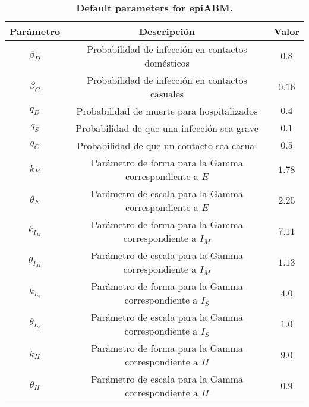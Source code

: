 \begin{table}[!ht]
    \centering
    \caption{\textbf{Default parameters for epiABM.}}
    \label{table:default_params}
    \begin{tabular}{|c|c|c|}
      \hline
      Parámetro & Descripción & Valor \\ \hline
      $\beta_D$      & Probabilidad de infección en contactos domésticos               & $0.8$ \\ \hline
      $\beta_C$      & Probabilidad de infección en contactos casuales                 & $0.16$ \\ \hline
      $q_D$          & Probabilidad de muerte para hospitalizados          & $0.4$ \\ \hline
      $q_S$          & Probabilidad de que una infección sea grave              & $0.1$ \\ \hline
      $q_C$          & Probabilidad de que un contacto sea casual                   & $0.5$ \\ \hline
      $k_{E}$        & Parámetro de forma para la Gamma correspondiente a $E$   & $1.78$ \\ \hline
      $\theta_{E}$   & Parámetro de escala para la Gamma correspondiente a  $E$   & $2.25$ \\ \hline
      $k_{I_M}$      & Parámetro de forma para la Gamma correspondiente a  $I_M$ & $7.11$ \\ \hline
      $\theta_{I_M}$ & Parámetro de escala para la Gamma correspondiente a  $I_M$ & $1.13$ \\ \hline
      $k_{I_S}$      & Parámetro de forma para la Gamma correspondiente a  $I_S$ & $4.0$ \\ \hline
      $\theta_{I_S}$ & Parámetro de escala para la Gamma correspondiente a  $I_S$ & $1.0$ \\ \hline
      $k_{H}$        & Parámetro de forma para la Gamma correspondiente a  $H$   & $9.0$ \\ \hline
      $\theta_{H}$   & Parámetro de escala para la Gamma correspondiente a  $H$   & $0.9$ \\ \hline
    \end{tabular}
  \end{table}
